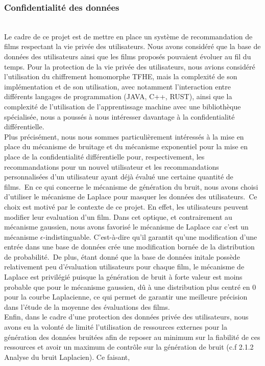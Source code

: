 \documentclass{article}
\begin{document}
\subsubsection{Confidentialité des données}
$ $\\
Le cadre de ce projet est de mettre en place un système de recommandation de films respectant la vie privée des utilisateurs. Nous avons
considéré que la base de données des utilisateurs ainsi que les films proposés pouvaient évoluer au fil du temps.
Pour la protection de la vie privée des utilisateurs, nous avions considéré l'utilisation du chiffrement homomorphe TFHE, mais
la complexité de son implémentation et de son utilisation, avec notamment l'interaction entre différents langages de programmation (JAVA, C++, RUST),
ainsi que la complexité de l'utilisation de l'apprentissage machine avec une bibliothèque spécialisée, nous a poussés à nous intéresser davantage à la confidentialité différentielle.\\
Plus précisément, nous nous sommes particulièrement intéressés à la mise en place du mécanisme de bruitage et du mécanisme exponentiel pour la mise
en place de la confidentialité différentielle pour, respectivement, les recommandations pour un nouvel utilisateur et les recommandations personnalisées
d'un utilisateur ayant déjà évalué une certaine quantité de films.\
En ce qui concerne le mécanisme de génération du bruit, nous avons choisi d'utiliser le mécanisme de Laplace pour masquer les données des utilisateurs.\
Ce choix est motivé par le contexte de ce projet. En effet, les utilisateurs peuvent modifier leur evaluation d'un film. Dans cet optique, et contrairement au
mécanisme gaussien, nous avons favorisé le mécanisme de Laplace car c'est un mécanisme $\epsilon$-indistinguable. C'est-à-dire qu'il garantit qu'une
modification d'une entrée dans une base de données crée une modification bornée de la distribution de probabilité.\
De plus, étant donné que la base de données initale possède relativement peu d'évaluation utilisateurs pour chaque film, le mécanisme de Laplace est privilégié
puisque la génération de bruit à forte valeur est moins probable que pour le mécanisme gaussien, dû à une distribution plus centré en 0 pour la courbe Laplacienne,
ce qui permet de garantir une meilleure précision dans l'étude de la moyenne des évaluations des films.\\
Enfin, dans le cadre d'une protection des données privée des utilisateurs, nous avons eu la volonté de limité l'utilisation de ressources externes
pour la génération des données bruitées afin de reposer au minimum sur la fiabilité de ces ressources et avoir un maximum de contrôle sur la génération de bruit (c.f 2.1.2 Analyse du bruit Laplacien). Ce faisant,
\end{document}
